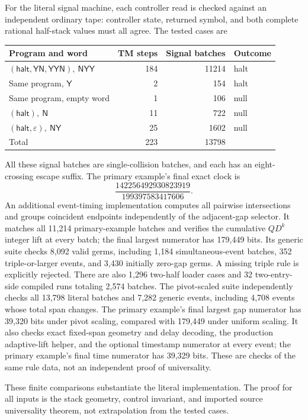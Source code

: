 \documentclass[11pt,letterpaper]{article}
\numberwithin{equation}{section}
\theoremstyle{definition}
\theoremstyle{remark}
\newcommand{\lab}[1]{\mathsf{#1}}\newcommand{\diag}{\operatorname{diag}}
\begin{document}
For the literal signal machine, each controller read is checked against an independent ordinary tape: controller state, returned symbol, and both complete rational half-stack values must all agree. The tested cases are
\begin{center}
\begin{tabular}{lrrl}
\toprule
Program and word & TM steps & Signal batches & Outcome\\
\midrule
$(\lab{halt},\lab{YN},\lab{YYN}),\ \lab{NYY}$ &184&11214&halt\\
Same program, $\lab Y$ &2&154&halt\\
Same program, empty word &1&106&null\\
$(\lab{halt}),\ \lab N$ &11&722&null\\
$(\lab{halt},\varepsilon),\ \lab{NY}$ &25&1602&null\\
\midrule
Total &223&13798&\\
\bottomrule
\end{tabular}
\end{center}
All these signal batches are single-collision batches, and each has an eight-crossing escape suffix. The primary example's final exact clock is
\[
 \frac{142256492930823919}{199397583417606}.
\]
An additional event-timing implementation computes all pairwise intersections and groups coincident endpoints independently of the adjacent-gap selector. It matches all 11,214 primary-example batches and verifies the cumulative $QD^k$ integer lift at every batch; the final largest numerator has 179,449 bits. Its generic suite checks 8,092 valid germs, including 1,184 simultaneous-event batches, 352 triple-or-larger events, and 3,430 initially zero-gap germs. A missing triple rule is explicitly rejected. There are also 1,296 two-half loader cases and 32 two-entry-side compiled runs totaling 2,574 batches. The pivot-scaled suite independently checks all 13,798 literal batches and 7,282 generic events, including 4,708 events whose total span changes. The primary example's final largest gap numerator has 39,320 bits under pivot scaling, compared with 179,449 under uniform scaling. It also checks exact fixed-span geometry and delay decoding, the production adaptive-lift helper, and the optional timestamp numerator at every event; the primary example's final time numerator has 39,329 bits. These are checks of the same rule data, not an independent proof of universality.

These finite comparisons substantiate the literal implementation. The proof for all inputs is the stack geometry, control invariant, and imported source universality theorem, not extrapolation from the tested cases.
\end{document}
